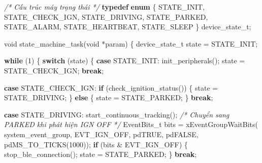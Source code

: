 \documentclass[a4paper]{extarticle}
\newenvironment{Shaded}{}{}
\newcommand{\CommentTok}[1]{\textcolor[rgb]{0.38,0.63,0.69}{\textit{#1}}}
\newcommand{\ControlFlowTok}[1]{\textcolor[rgb]{0.00,0.44,0.13}{\textbf{#1}}}
\newcommand{\DataTypeTok}[1]{\textcolor[rgb]{0.56,0.13,0.00}{#1}}
\newcommand{\DecValTok}[1]{\textcolor[rgb]{0.25,0.63,0.44}{#1}}
\newcommand{\KeywordTok}[1]{\textcolor[rgb]{0.00,0.44,0.13}{\textbf{#1}}}
\newcommand{\NormalTok}[1]{#1}
\newcommand{\OperatorTok}[1]{\textcolor[rgb]{0.40,0.40,0.40}{#1}}
\begin{document}
\begin{Shaded}
\begin{Highlighting}[]
\CommentTok{/* Cấu trúc máy trạng thái */}
\KeywordTok{typedef} \KeywordTok{enum} \OperatorTok{\{}
\NormalTok{    STATE\_INIT}\OperatorTok{,}
\NormalTok{    STATE\_CHECK\_IGN}\OperatorTok{,}
\NormalTok{    STATE\_DRIVING}\OperatorTok{,}
\NormalTok{    STATE\_PARKED}\OperatorTok{,}
\NormalTok{    STATE\_ALARM}\OperatorTok{,}
\NormalTok{    STATE\_HEARTBEAT}\OperatorTok{,}
\NormalTok{    STATE\_SLEEP}
\OperatorTok{\}}\NormalTok{ device\_state\_t}\OperatorTok{;}

\DataTypeTok{void}\NormalTok{ state\_machine\_task}\OperatorTok{(}\DataTypeTok{void} \OperatorTok{*}\NormalTok{param}\OperatorTok{)} \OperatorTok{\{}
\NormalTok{    device\_state\_t state }\OperatorTok{=}\NormalTok{ STATE\_INIT}\OperatorTok{;}

    \ControlFlowTok{while} \OperatorTok{(}\DecValTok{1}\OperatorTok{)} \OperatorTok{\{}
        \ControlFlowTok{switch} \OperatorTok{(}\NormalTok{state}\OperatorTok{)} \OperatorTok{\{}
        \ControlFlowTok{case}\NormalTok{ STATE\_INIT}\OperatorTok{:}
\NormalTok{            init\_peripherals}\OperatorTok{();}
\NormalTok{            state }\OperatorTok{=}\NormalTok{ STATE\_CHECK\_IGN}\OperatorTok{;}
            \ControlFlowTok{break}\OperatorTok{;}

        \ControlFlowTok{case}\NormalTok{ STATE\_CHECK\_IGN}\OperatorTok{:}
            \ControlFlowTok{if} \OperatorTok{(}\NormalTok{check\_ignition\_status}\OperatorTok{())} \OperatorTok{\{}
\NormalTok{                state }\OperatorTok{=}\NormalTok{ STATE\_DRIVING}\OperatorTok{;}
            \OperatorTok{\}} \ControlFlowTok{else} \OperatorTok{\{}
\NormalTok{                state }\OperatorTok{=}\NormalTok{ STATE\_PARKED}\OperatorTok{;}
            \OperatorTok{\}}
            \ControlFlowTok{break}\OperatorTok{;}

        \ControlFlowTok{case}\NormalTok{ STATE\_DRIVING}\OperatorTok{:}
\NormalTok{            start\_continuous\_tracking}\OperatorTok{();}
            \CommentTok{/* Chuyển sang PARKED khi phát hiện IGN OFF */}
\NormalTok{            EventBits\_t bits }\OperatorTok{=}\NormalTok{ xEventGroupWaitBits}\OperatorTok{(}
\NormalTok{                system\_event\_group}\OperatorTok{,}\NormalTok{ EVT\_IGN\_OFF}\OperatorTok{,}
\NormalTok{                pdTRUE}\OperatorTok{,}\NormalTok{ pdFALSE}\OperatorTok{,}\NormalTok{ pdMS\_TO\_TICKS}\OperatorTok{(}\DecValTok{1000}\OperatorTok{));}
            \ControlFlowTok{if} \OperatorTok{(}\NormalTok{bits }\OperatorTok{\&}\NormalTok{ EVT\_IGN\_OFF}\OperatorTok{)} \OperatorTok{\{}
\NormalTok{                stop\_ble\_connection}\OperatorTok{();}
\NormalTok{                state }\OperatorTok{=}\NormalTok{ STATE\_PARKED}\OperatorTok{;}
            \OperatorTok{\}}
            \ControlFlowTok{break}\OperatorTok{;}


\end{Highlighting}
\end{Shaded}
\end{document}
